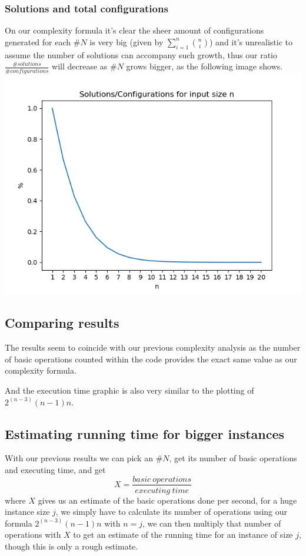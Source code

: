 \documentclass[...]{revdetua}
\begin{document}
\subsubsection{Solutions and total configurations}
On our complexity formula it's clear the sheer amount of configurations generated for each $\#N$ is very big (given by $\sum_{i=1}^{n}{{n}\choose{i}}$) and it's unrealistic to assume the number of solutions can accompany such growth, thus our ratio $\frac{\#solutions}{\#configurations}$ will decrease as $\#N$ grows bigger, as the following image shows.
\includegraphics[scale=0.5]{solconfig.png}
\subsection{Comparing results}
The results seem to coincide with our previous complexity analysis as the number of basic operations counted within the code provides the exact same value as our complexity formula.\par
And the execution time graphic is also very similar to the plotting of ${2^{(n-3)}(n-1)n}$.
\subsection{Estimating running time for bigger instances}
With our previous results we can pick an $\#N$, get its number of basic operations and executing time, and get $$X=\frac{basic\ operations}{executing\ time}$$ where $X$ gives us an estimate of the basic operations done per second, for a huge instance size $j$, we simply have to calculate its number of operations using  our formula $2^{(n-3)}(n-1)n$ with $n=j$, we can then multiply that number of operations with $X$ to get an estimate of the running time for an instance of size $j$, though this is only a rough estimate.
\end{document}
